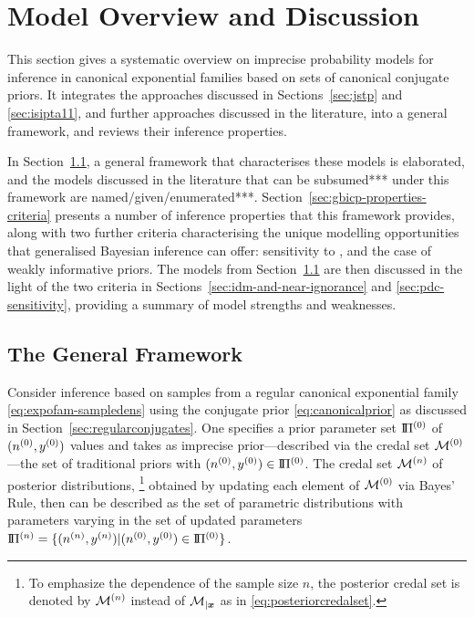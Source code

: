\newpage

\section{Model Overview and Discussion}
\label{sec:generalmodel}


This section gives a systematic overview on imprecise probability models
for inference in canonical exponential families
based on sets of canonical conjugate priors.
It integrates the approaches discussed in Sections~\ref{sec:jstp} and \ref{sec:isipta11},
and further approaches discussed in the literature, into a general framework,
and reviews their inference properties.

\medskip

In Section~\ref{sec:basicsetting}, a general framework that characterises these models is elaborated,
and the models discussed in the literature that can be subsumed*** under this framework are named/given/enumerated***.
%
Section~\ref{sec:gbicp-properties-criteria} presents a number of inference properties that this framework provides,
along with two further criteria characterising the unique modelling opportunities that
generalised Bayesian inference can offer: sensitivity to \pdc, and the case of weakly informative priors.
%
The models from Section~\ref{sec:basicsetting} are then discussed in the light of the two criteria in
Sections~\ref{sec:idm-and-near-ignorance} and \ref{sec:pdc-sensitivity},
providing a summary of model strengths and weaknesses.


\subsection{The General Framework}
\label{sec:basicsetting}

Consider inference based on samples from a regular canonical exponential family \eqref{eq:expofam-sampledens}
using the conjugate prior \eqref{eq:canonicalprior} as discussed in Section~\ref{sec:regularconjugates}.
One specifies a prior parameter set $\text{I}\!\Pi^{(0)}$ of $(n^{(0)},y^{(0)})$ values
and takes as imprecise prior---described via the credal set $\mathcal{M}^{(0)}$---the set of traditional priors with $(n^{(0)}, y^{(0)}) \in \text{I}\!\Pi^{(0)}$.
The credal set $\mathcal{M}^{(n)}$ of posterior distributions,%
\footnote{To emphasize the dependence of the sample size $n$,
the posterior credal set is denoted by $\mathcal{M}^{(n)}$ instead of $\mathcal{M}_{\vert {\bm x}}$ as in \eqref{eq:posteriorcredalset}.}
obtained by updating each element of $\mathcal{M}^{(0)}$ via Bayes' Rule,
then can be described as the set of parametric distributions
with parameters varying in the set of updated parameters $\text{I}\!\Pi^{(n)} = \{(n^{(n)},y^{(n)}) \vert (n^{(0)}, y^{(0)}) \in \text{I}\!\Pi^{(0)}\}$.

